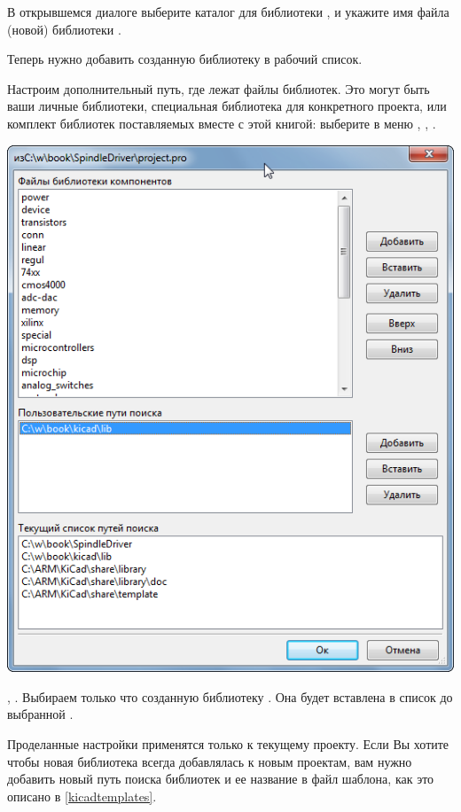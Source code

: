 В открывшемся диалоге выберите каталог для библиотеки
, и укажите имя файла (новой) библиотеки
.

\bigskip
Теперь нужно добавить созданную библиотеку в рабочий список.
\bigskip

Настроим дополнительный путь, где лежат файлы библиотек. Это могут быть ваши
личные библиотеки, специальная библиотека для конкретного проекта, или комплект
библиотек поставляемых вместе с этой книгой: выберите в меню
, , .

\includegraphics[height=0.5\textheight]{kicad/lib25.png}

,
.
Выбираем только что созданную библиотеку .
Она будет вставлена в список до выбранной .

\bigskip
Проделанные настройки применятся только к текущему проекту. Если Вы хотите 
чтобы новая библиотека всегда добавлялась к новым проектам, вам нужно добавить
новый путь поиска библиотек и ее название в файл шаблона, как это описано в
\ref{kicadtemplates}.


